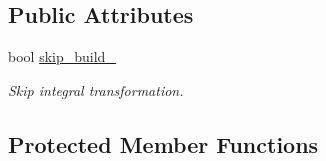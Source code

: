 \subsection*{Public Attributes}
\begin{DoxyCompactItemize}
\item 
bool \mbox{\hyperlink{classforte_1_1_forte_integrals_aed0fc4c8db2559e805b61739b8b3fcfc}{skip\+\_\+build\+\_\+}}
\begin{DoxyCompactList}\small\item\em Skip integral transformation. \end{DoxyCompactList}\end{DoxyCompactItemize}
\subsection*{Protected Member Functions}
